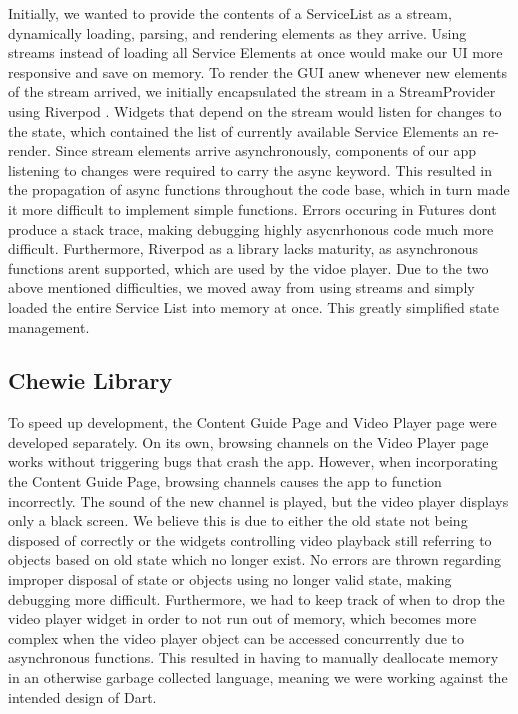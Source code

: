 \documentclass[conference]{IEEEtran}
\begin{document}
Initially, we wanted to provide the contents of a ServiceList as a stream, dynamically loading, parsing, and rendering elements as they arrive.
Using streams instead of loading all Service Elements at once would make our UI more responsive and save on memory.
To render the GUI anew whenever new elements of the stream arrived, we initially encapsulated the stream in a StreamProvider using Riverpod \cite{RiverPod}. Widgets that depend on the stream would listen for changes to the state, which contained the list of currently available Service Elements an re-render. Since stream elements arrive asynchronously, components of our app listening to changes were required to carry the async keyword. This resulted in the propagation of async functions throughout the code base, which in turn made it more difficult to implement simple functions. Errors occuring in Futures dont produce a stack trace, making debugging highly asycnrhonous code much more difficult. Furthermore, Riverpod as a library lacks maturity, as asynchronous functions arent supported, which are used by the vidoe player. Due to the two above mentioned difficulties, we moved away from using streams and simply loaded the entire Service List into memory at once. This greatly simplified state management.

\subsection{Chewie Library} 
To speed up development, the Content Guide Page and Video Player page were developed separately. On its own, browsing channels on the Video Player page works without triggering bugs that crash the app. However, when incorporating the Content Guide Page, browsing channels causes the app to function incorrectly. The sound of the new channel is played, but the video player displays only a black screen. We believe this is due to either the old state not being disposed of correctly or the widgets controlling video playback still referring to objects based on old state which no longer exist. No errors are thrown regarding improper disposal  of state or objects using no longer valid state, making debugging more difficult. Furthermore, we had to keep track of when to drop the video player widget in order to not run out of memory, which becomes more complex when the video player object can be accessed concurrently due to asynchronous functions. This resulted in having to manually deallocate memory in an otherwise garbage collected language, meaning we were working against the intended design of Dart.
\end{document}
